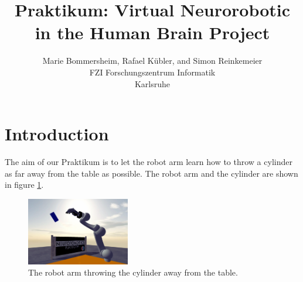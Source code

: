 \documentclass[10pt,twocolumn,letterpaper]{article}
\begin{document}
\title{Praktikum: Virtual Neurorobotic in the Human Brain Project}

\author{Marie Bommersheim, Rafael K\"ubler, and Simon Reinkemeier\\
FZI Forschungszentrum Informatik\\
Karlsruhe\\
}

\maketitle

\begin{abstract}
   
\end{abstract}

\section{Introduction}

The aim of our Praktikum is to let the robot arm learn how to throw a cylinder as far away from the table as possible. The robot arm and the cylinder are shown in figure \ref{fig:challenge}.

\begin{figure}
	\begin{center}
		\includegraphics[width=0.4\textwidth]{hbpprak_2018}
	\end{center}
	\caption{The robot arm throwing the cylinder away from the table.}
	\label{fig:challenge}
\end{figure}
\end{document}
